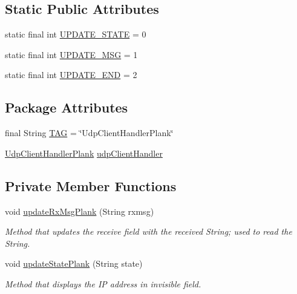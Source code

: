 \subsection*{Static Public Attributes}
\begin{DoxyCompactItemize}
\item 
static final int \mbox{\hyperlink{classcom_1_1example_1_1trainawearapplication_1_1_udp_client_handler_plank_af27cd7ec8aca34d7c434ddaeb312f907}{U\+P\+D\+A\+T\+E\+\_\+\+S\+T\+A\+TE}} = 0
\item 
static final int \mbox{\hyperlink{classcom_1_1example_1_1trainawearapplication_1_1_udp_client_handler_plank_a74216073d90f6a9a7ab3731239f93eb3}{U\+P\+D\+A\+T\+E\+\_\+\+M\+SG}} = 1
\item 
static final int \mbox{\hyperlink{classcom_1_1example_1_1trainawearapplication_1_1_udp_client_handler_plank_a75f364bd8c7c31476d6f9d2b621765c8}{U\+P\+D\+A\+T\+E\+\_\+\+E\+ND}} = 2
\end{DoxyCompactItemize}
\subsection*{Package Attributes}
\begin{DoxyCompactItemize}
\item 
final String \mbox{\hyperlink{classcom_1_1example_1_1trainawearapplication_1_1_udp_client_handler_plank_aaf49e29b5578a6b8975c329cf97bca15}{T\+AG}} = \char`\"{}Udp\+Client\+Handler\+Plank\char`\"{}
\item 
\mbox{\hyperlink{classcom_1_1example_1_1trainawearapplication_1_1_udp_client_handler_plank}{Udp\+Client\+Handler\+Plank}} \mbox{\hyperlink{classcom_1_1example_1_1trainawearapplication_1_1_udp_client_handler_plank_a3d0b57ac9851760ca266fcc7ba6ddad1}{udp\+Client\+Handler}}
\end{DoxyCompactItemize}
\subsection*{Private Member Functions}
\begin{DoxyCompactItemize}
\item 
void \mbox{\hyperlink{classcom_1_1example_1_1trainawearapplication_1_1_udp_client_handler_plank_a83b0d0b19d7c9be902069368bd7fa84f}{update\+Rx\+Msg\+Plank}} (String rxmsg)
\begin{DoxyCompactList}\small\item\em Method that updates the receive field with the received String; used to read the String. \end{DoxyCompactList}\item 
void \mbox{\hyperlink{classcom_1_1example_1_1trainawearapplication_1_1_udp_client_handler_plank_a68ceca8349b52704db25834ca5eb5b38}{update\+State\+Plank}} (String state)
\begin{DoxyCompactList}\small\item\em Method that displays the IP address in invisible field. \end{DoxyCompactList}\end{DoxyCompactItemize}
